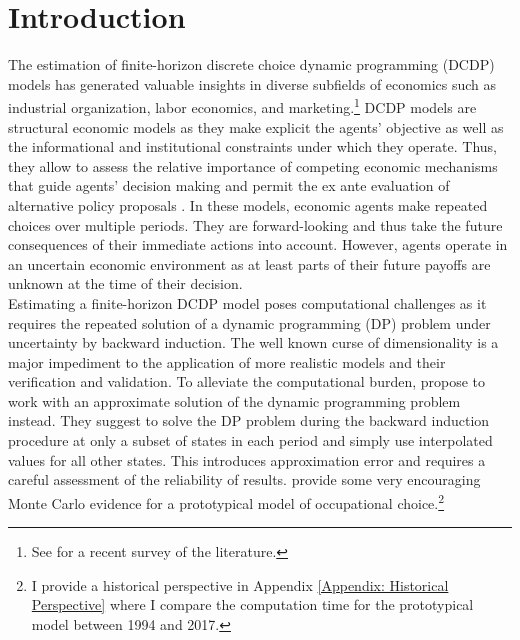 \section{Introduction}
The estimation of finite-horizon discrete choice dynamic programming (DCDP) models has generated valuable insights in diverse subfields of economics such as industrial organization, labor economics, and marketing.\footnote{See \citet{Keane.2011d} for a recent survey of the literature.} DCDP models are structural economic models as they make explicit the agents' objective as well as the informational and institutional constraints under which they operate. Thus, they allow to assess the relative importance of competing economic mechanisms that guide agents' decision making and permit the ex ante evaluation of alternative policy proposals \citep{Wolpin.2013}. In these models, economic agents make repeated choices over multiple periods. They are forward-looking and thus take the future consequences of their immediate actions into account. However, agents operate in an uncertain economic environment as at least parts of their future payoffs are unknown at the time of their decision.\\\newline
%
Estimating a finite-horizon DCDP model poses computational challenges as it requires the repeated solution of a dynamic programming (DP) problem under uncertainty by backward induction. The well known curse of dimensionality \citep{Bellman.1957} is a major impediment to the application of more realistic models and their verification and validation. To alleviate the computational burden, \citet{Keane.1994} propose to work with an approximate solution of the dynamic programming problem instead. They suggest to solve the DP problem during the backward induction procedure at only a subset of states in each period and simply use interpolated values for all other states. This introduces approximation error and requires a careful assessment of the reliability of results. \citet{Keane.1994} provide some very encouraging Monte Carlo evidence for a prototypical model of occupational choice.\footnote{I provide a historical perspective in Appendix \ref{Appendix: Historical Perspective} where I compare the computation time for the prototypical model between 1994 and 2017.}\\\newline
%
